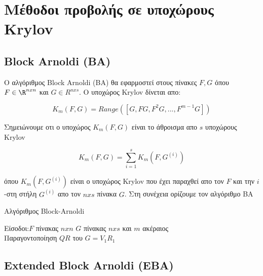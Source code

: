 \chapter{Μέθοδοι προβολής σε υποχώρους Krylov}
\label{ch:5.chapterAlgorithms}

\section{\textlatin{Block Arnoldi (BA)}}
Ο αλγόριθμος \textlatin{Block Arnoldi (BA)} θα εφαρμοστεί στους πίνακες $F, G$ όπου $F \in \R^{nxn}$ και $G \in R^{nxs}$. Ο υποχώρος \textlatin{Krylov} δίνεται απο:

\begin{equation}
K_m(F,G) = Range([G, F G,F^2G,...,F^{m-1}G])
\end{equation}

Σημειώνουμε οτι ο υποχώρος $K_m(F,G)$ είναι το άθροισμα απο $s$ υποχώρους \textlatin{Krylov}

\begin{equation}
K_m(F,G) = \sum_{i=1}^{s}K_m(F,G^{(i)})
\end{equation}

όπου $K_m(F, G^{(i)})$ είναι ο υποχώρος \textlatin{Krylov} που έχει παραχθεί απο τον $F$ και την $i$-στη στήλη $G^{(i)}$ απο τον $n x s$ πίνακα $G$.
Στη συνέχεια ορίζουμε τον αλγόριθμο ΒΑ ~\cite{heyouni2010extended, articleKrylovSubspaceMethods,jbilou2003block}

\begin{algorithm}[H]
    \SetAlgoLined
    \caption{ Αλγόριθμος  Block-Arnoldi}
    Είσοδοι:$F$ πίνακας $n x n$ $G$ πίνακας $n x s$ και $m$ ακέραιος\\
    Παραγοντοποίηση $QR$ του $G = V_1 R_1$\\
\end{algorithm}



\section{\textlatin{Extended Block Arnoldi (EBA)}} \label{EBA}

